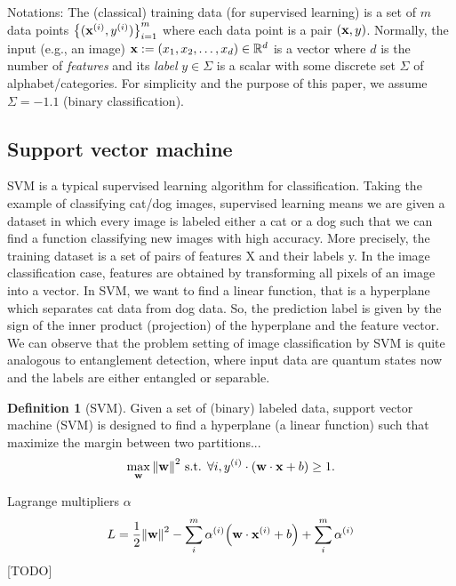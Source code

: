 \documentclass[
aps,
pra,
twocolumn,
floatfix,
]{revtex4-2}
\theoremstyle{plain}
\theoremstyle{definition}
\newtheorem{definition}{Definition}
\begin{document}
Notations:
The (classical) training data (for supervised learning) is a set of $m$ data points $\qty{(\vb{x}^{(i)}, y^{(i)})}^{m}_{i=1}$ 
where each data point is a pair $(\vb{x},y)$.
Normally, the input (e.g., an image) $\vb{x}:= (x_1,x_2,\dots,x_d) \in \mathbb{R}^d$  is a vector where $d$ is the number of \emph{features}
and its \emph{label} $y\in\Sigma$ is a scalar with some discrete set $\Sigma$ of alphabet/categories. 
For simplicity and the purpose of this paper, we assume $\Sigma=\qty{-1,1}$ (binary classification).


\subsection{Support vector machine}\label{sec:svm}
SVM is a typical supervised learning algorithm for classification. Taking the example of classifying cat/dog images, supervised learning means we are given a dataset in which every image is labeled either a cat or a dog such that we can find a function classifying new images with high accuracy. More precisely,  the training dataset is a set of pairs of features X and their labels y. In the image classification case, features are obtained by transforming all pixels of an image into a vector. In SVM, we want to find a linear function, that is a hyperplane which separates cat data from dog data. So, the prediction label is given by the sign of the inner product (projection) of the hyperplane and the feature vector. We can observe that the problem setting of image classification by SVM is quite analogous to entanglement detection, where input data are quantum states now and the labels are either entangled or separable.


\begin{definition}[SVM]\label{def:svm}
	Given a set of (binary) labeled data,
	support vector machine (SVM) is designed to
	find a hyperplane (a linear function) such that maximize the margin between two partitions...
	\begin{equation}
		\max_{\vb{w}}
		\norm{\vb{w}}^2
		\text{ s.t. }
		\forall i , y^{(i)}\cdot (\vb{w}\cdot\vb{x}+b)\ge 1.
		\label{eq:svm_opt}
	\end{equation}
\end{definition}
Lagrange multipliers $\alpha$
\begin{equation}
	L = \frac{1}{2}\norm{\vb{w}}^2 - \sum_i^m \alpha^{(i)} \qty(\vb{w}\cdot \vb{x}^{(i)} + b) + \sum_i^m \alpha^{(i)}
\end{equation}
[TODO]
\end{document}
